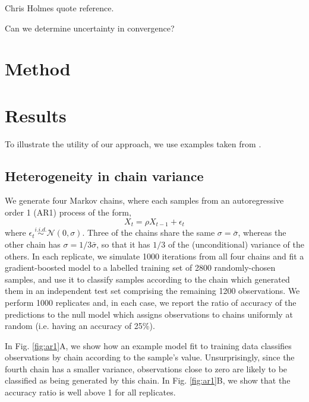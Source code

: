 \documentclass{article}
\begin{document}
Chris Holmes quote reference.

Can we determine uncertainty in convergence?

\section{Method}

\section{Results}
To illustrate the utility of our approach, we use examples taken from \cite{vehtari2019rank}.

\subsection{Heterogeneity in chain variance}\label{sec:heterogeneity}
We generate four Markov chains, where each samples from an autoregressive order 1 (AR1) process of the form,
%
\begin{equation}
X_t = \rho X_{t-1} + \epsilon_t
\end{equation}
%
where $\epsilon_t\stackrel{i.i.d.}{\sim}\mathcal{N}(0, \sigma)$. Three of the chains share the same $\sigma=\bar{\sigma}$, whereas the other chain has $\sigma=1/3\bar{\sigma}$, so that it has $1/3$ of the (unconditional) variance of the others. In each replicate, we simulate 1000 iterations from all four chains and fit a gradient-boosted model to a labelled training set of 2800 randomly-chosen samples, and use it to classify samples according to the chain which generated them in an independent test set comprising the remaining 1200 observations. We perform 1000 replicates and, in each case, we report the ratio of accuracy of the predictions to the null model which assigns observations to chains uniformly at random (i.e. having an accuracy of 25\%).

In Fig. \ref{fig:ar1}A, we show how an example model fit to training data classifies observations by chain according to the sample's value. Unsurprisingly, since the fourth chain has a smaller variance, observations close to zero are likely to be classified as being generated by this chain. In Fig. \ref{fig:ar1}B, we show that the accuracy ratio is well above 1 for all replicates.
\end{document}
